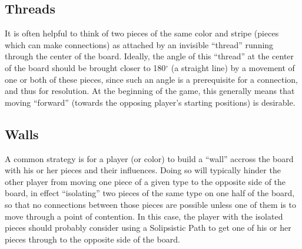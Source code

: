 %

\subsection{Threads}\label{threads}
  It is often helpful to think of two pieces of the same color and stripe
  (pieces which can make connections) as attached by an invisible
  ``thread'' running through the center of the board.  Ideally, the angle of
  this ``thread'' at the center of the board should be brought closer to
  180$^\circ$ (a straight line) by a movement of one or both of these
  pieces, since such an angle is a prerequisite for a connection, and
  thus for resolution.  At the beginning of the game, this generally
  means that moving ``forward'' (towards the opposing player's starting
  positions) is desirable.

\subsection{Walls}\label{walls}
  A common strategy is for a player (or color) to build a ``wall'' accross the board
  with his or her pieces and their influences.  Doing so will typically hinder the other
  player from moving one piece of a given type to the opposite side of the board, in
  effect ``isolating'' two pieces of the same type on one half of the board, so that no
  connections between those pieces are possible unless one of them is to move through
  a point of contention.  In this case, the player with the isolated pieces should
  probably consider using a Solipsistic Path to get one of his or her
  pieces through to the opposite side of the board.

